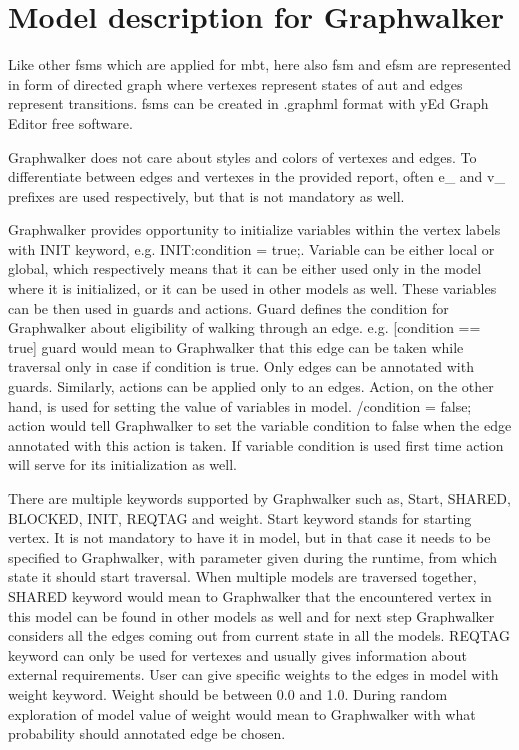 \section{Model description for Graphwalker}
\par
Like other \acrshort{fsm}s which are applied for \acrshort{mbt}, here also \acrshort{fsm} and \acrshort{efsm} are represented in form of directed graph where vertexes represent states of \acrshort{aut} and edges represent transitions. \acrshort{fsm}s can be created in .graphml format with yEd Graph Editor free software.

\par
Graphwalker does not care about styles and colors of vertexes and edges. To differentiate between edges and vertexes in the provided report, often e\_ and v\_ prefixes are used respectively, but that is not mandatory as well.

\par
Graphwalker provides opportunity to initialize variables within the vertex labels with INIT keyword, e.g. INIT:condition = true;. Variable can be either local or global, which respectively means that it can be either used only in the model where it is initialized, or it can be used in other models as well. These variables can be then used in guards and actions. Guard defines the condition for Graphwalker about eligibility of walking through an edge. e.g. [condition == true] guard would mean to Graphwalker that this edge can be taken while traversal only in case if condition is true. Only edges can be annotated with guards. Similarly, actions can be applied only to an edges. Action, on the other hand, is used for setting the value of variables in model. /condition = false; action would tell Graphwalker to set the variable condition to false when the edge annotated with this action is taken. If variable condition is used first time action will serve for its initialization as well. 

\par
There are multiple keywords supported by Graphwalker such as, Start, SHARED, BLOCKED, INIT, REQTAG and weight. Start keyword stands for starting vertex. It is not mandatory to have it in model, but in that case it needs to be specified to Graphwalker, with parameter given during the runtime, from which state it should start traversal. When multiple models are traversed together, SHARED keyword would mean to Graphwalker that the encountered vertex in this model can be found in other models as well and for next step Graphwalker considers all the edges coming out from current state in all the models. REQTAG keyword can only be used for vertexes and usually gives information about external requirements. User can give specific weights to the edges in model with weight keyword. Weight should be between 0.0 and 1.0. During random exploration of model value of weight would mean to Graphwalker with what probability should annotated edge be chosen.

